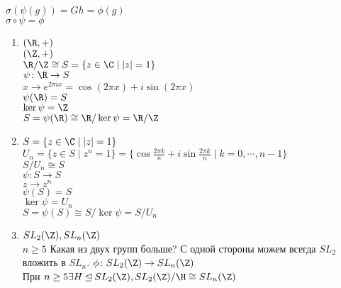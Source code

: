 \begin{Rem}
$\sigma(\psi(g)) = Gh = \phi(g)$ \\
$\sigma \circ \psi = \phi$\\
\end{Rem}
\begin{exmp}\hfill
\begin{enumerate}
\item
$(\R, +)$\\
$(\Z, +)$\\
$\R / \Z \cong S = \{z \in \C \mid |z| = 1\}$ \\
$\psi\colon \R \to S$\\
$x \to e^{2\pi i x} = \cos(2\pi x) + i \sin(2\pi x)$\\
$\psi(\R) = S$\\
$\ker \psi = \Z$\\
$S = \psi(\R) \cong \R / \ker \psi = \R / \Z$\\
\item
$S = \{z \in \C \mid |z| = 1\}$\\
$U_n = \{z \in S \mid z^n = 1\} = \{\cos \frac{2\pi k}{n} + i \sin\frac{2\pi k}{n} \mid k = 0, \cdots, n - 1\}$\\
$S / U_n \cong S$\\
$\psi\colon S \to S$\\
$z \to z^{n}$\\
$\psi(S) = S$\\
$\ker \psi = U_n$\\
$S = \psi(S) \cong S / \ker \psi = S / U_n$\\
\item
$SL_2(\Z), SL_n(\Z)$\\
$n \ge 5$
Какая из двух групп больше? 
С одной стороны можем всегда $SL_2$ вложить в $SL_n$.
$\phi \colon SL_2(\Z) \to SL_n(\Z)$\\
При $n \ge 5 \exists H \unlhd SL_2(\Z), SL_2(\Z) / \H \cong SL_n(\Z)$
\end{enumerate}
\end{exmp}